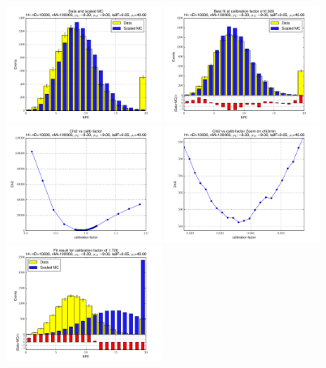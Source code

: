 
 \begin{figure}[htbp] \begin{center} 
\includegraphics[width=0.45\textwidth]{../FIGURES/14/FIG_Data_and_scaled_MC.pdf} 
\includegraphics[width=0.45\textwidth]{../FIGURES/14/FIG_Best_fit_at_calibration_factor_of_0_928.pdf} 
\includegraphics[width=0.45\textwidth]{../FIGURES/14/FIG_Chi2_vs_calib_factor.pdf} 
\includegraphics[width=0.45\textwidth]{../FIGURES/14/FIG_Chi2_vs_calib_factor_Zoom_on_chi2min.pdf} 
\includegraphics[width=0.45\textwidth]{../FIGURES/14/FIG_Fit_result_for_calibration_factor_of_1_720.pdf} 

\end{center}
\end{figure}
